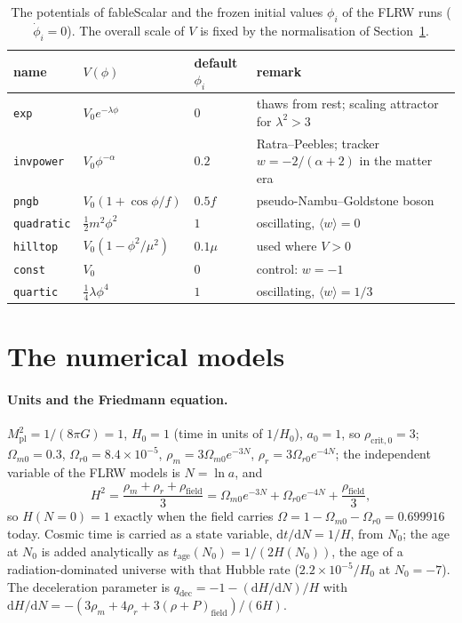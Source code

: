 \documentclass[11pt,a4paper]{article}
\newcommand{\fableScalar}{\textsf{fableScalar}}
\newcommand{\dd}{\mathrm{d}}
\begin{document}
\begin{table}[htbp]
\centering\small
\caption{The potentials of \fableScalar{} and the frozen initial values $\phi_i$ of the FLRW runs
($\dot\phi_i=0$). The overall scale of $V$ is fixed by the normalisation of
Section~\ref{sec:models}.}
\label{tab:scalarpot}
\begin{tabular}{@{}l l l l@{}}
\toprule
name & $V(\phi)$ & default $\phi_i$ & remark \\
\midrule
\texttt{exp} & $V_0e^{-\lambda\phi}$ & $0$ & thaws from rest; scaling attractor for $\lambda^2>3$ \cite{Copeland1998} \\
\texttt{invpower} & $V_0\phi^{-\alpha}$ & $0.2$ & Ratra--Peebles; tracker $w=-2/(\alpha+2)$ in the matter era \\
\texttt{pngb} & $V_0(1+\cos\phi/f)$ & $0.5f$ & pseudo-Nambu--Goldstone boson \cite{Frieman1995} \\
\texttt{quadratic} & $\tfrac12m^2\phi^2$ & $1$ & oscillating, $\langle w\rangle=0$ \\
\texttt{hilltop} & $V_0(1-\phi^2/\mu^2)$ & $0.1\mu$ & used where $V>0$ \\
\texttt{const} & $V_0$ & $0$ & control: $w=-1$ \\
\texttt{quartic} & $\tfrac14\lambda\phi^4$ & $1$ & oscillating, $\langle w\rangle=1/3$ \\
\bottomrule
\end{tabular}
\end{table}

\section{The numerical models}\label{sec:models}

\paragraph{Units and the Friedmann equation.} $M_{\mathrm{pl}}^2=1/(8\pi G)=1$, $H_0=1$ (time in
units of $1/H_0$), $a_0=1$, so $\rho_{\mathrm{crit},0}=3$; $\Omega_{m0}=0.3$,
$\Omega_{r0}=8.4\times10^{-5}$, $\rho_m=3\Omega_{m0}e^{-3N}$, $\rho_r=3\Omega_{r0}e^{-4N}$; the
independent variable of the FLRW models is $N=\ln a$, and
\begin{equation}\label{eq:friedmann}
  H^2=\frac{\rho_m+\rho_r+\rho_{\mathrm{field}}}{3}=\Omega_{m0}e^{-3N}+\Omega_{r0}e^{-4N}+\frac{\rho_{\mathrm{field}}}{3},
\end{equation}
so $H(N=0)=1$ exactly when the field carries $\Omega=1-\Omega_{m0}-\Omega_{r0}=0.699916$ today.
Cosmic time is carried as a state variable, $\dd t/\dd N=1/H$, from $N_0$; the age at $N_0$ is
added analytically as $t_{\mathrm{age}}(N_0)=1/(2H(N_0))$, the age of a radiation-dominated
universe with that Hubble rate ($2.2\times10^{-5}/H_0$ at $N_0=-7$). The deceleration parameter is
$q_{\mathrm{dec}}=-1-(\dd H/\dd N)/H$ with $\dd H/\dd N=-(3\rho_m+4\rho_r+3(\rho+P)_{\mathrm{field}})/(6H)$.
\end{document}

